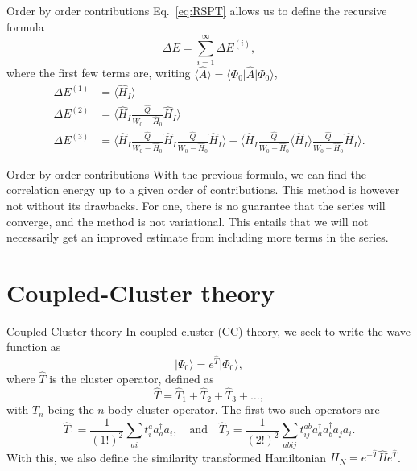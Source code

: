 \documentclass[UKenglish,aspectratio=169]{beamer}
\begin{document}
\begin{frame}{Order by order contributions}
    Eq.~\eqref{eq:RSPT} allows us to define the recursive formula
    \begin{equation}
        \Delta E = \sum_{i = 1}^\infty \Delta E^{(i)},
    \end{equation}
    where the first few terms are, writing $\langle \hat{A} \rangle = \langle \Phi_0 \vert \hat{A} \vert \Phi_0 \rangle$,
    \begin{align}
        \Delta E^{(1)} &= \Big\langle \hat{H}_I \Big\rangle \\
        \Delta E^{(2)} &= \Big\langle \hat{H}_I \frac{\hat{Q}}{W_0 - \hat{H}_0} \hat{H}_I \Big\rangle \\
        \Delta E^{(3)} &=
        \Big\langle
        \hat{H}_I \frac{\hat{Q}}{W_0 - \hat{H}_0}
        \hat{H}_I \frac{\hat{Q}}{W_0 - \hat{H}_0}
        \hat{H}_I
        \Big\rangle
        - \Big\langle
        \hat{H}_I \frac{\hat{Q}}{W_0 - \hat{H}_0}
        \Big\langle \hat{H}_I \Big\rangle
        \frac{\hat{Q}}{W_0 - \hat{H}_0} \hat{H}_I
        \Big\rangle.
    \end{align}
\end{frame}

\begin{frame}{Order by order contributions}
    With the previous formula, we can find the correlation energy up to a given order of contributions.
    This method is however not without its drawbacks.
    For one, there is no guarantee that the series will converge, and the method is not variational.
    This entails that we will not necessarily get an improved estimate from including more terms in the series.
\end{frame}

\section{Coupled-Cluster theory}

\begin{frame}{Coupled-Cluster theory}
    In coupled-cluster (CC) theory, we seek to write the wave function as
    \begin{equation}
        \lvert \Psi_0 \rangle = e^{\hat{T}} \lvert \Phi_0 \rangle,
    \end{equation}
    where $\hat{T}$ is the cluster operator, defined as
    \begin{equation}
        \hat{T} = \hat{T}_1 + \hat{T}_2 + \hat{T}_3 + \ldots,
    \end{equation}
    with $\hat{T}_n$ being the $n$-body cluster operator.
    The first two such operators are
    \begin{equation}
        \hat{T}_1 = \frac{1}{(1!)^2}\sum_{ai} t_i^a a_a^\dagger a_i,
        \quad \text{and} \quad
        \hat{T}_2 = \frac{1}{(2!)^2} \sum_{abij} t_{ij}^{ab} a_a^\dagger a_b^\dagger a_j a_i.
    \end{equation}
    With this, we also define the similarity transformed Hamiltonian $\overline{H_N} = e^{-\hat{T}} \hat{H} e^{\hat{T}}$.
\end{frame}
\end{document}
